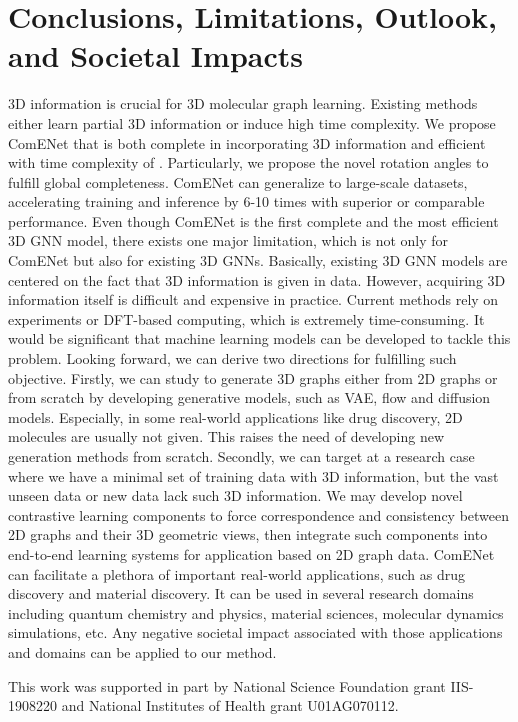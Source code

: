 \documentclass{article}
\begin{document}
\section{Conclusions, Limitations, Outlook, and Societal Impacts}
3D information is crucial for 3D molecular graph learning.
Existing methods either learn partial 3D information or induce high time complexity.
We propose ComENet that is both complete in incorporating 3D information and efficient 
with time complexity of .
Particularly, we propose the novel rotation angles to fulfill global completeness.
ComENet can generalize to large-scale datasets,
accelerating training and inference by 6-10 times with superior or comparable performance.
\textcolor{COLOR}{Even though ComENet is the first complete and the most efficient 3D GNN model, there exists one major limitation, which is not only for
ComENet but also for existing 3D GNNs. Basically, existing 3D GNN models
are centered on the fact that 3D information is given in data.
However, acquiring 3D information itself is difficult and expensive in practice.
Current methods rely on experiments or
DFT-based computing, which is extremely time-consuming. 
It would be significant that machine
learning models can be developed to tackle this problem.
Looking forward, we can derive two directions for fulfilling such objective.
Firstly, we can study to generate 3D graphs either from 2D graphs or from scratch by developing generative models,
such as VAE, flow and diffusion models.
Especially, in some real-world applications like drug discovery, 2D molecules are usually not given.
This raises the need of developing new generation methods from scratch.
Secondly, we can target at a research case where we have a minimal set of training data with
3D information, but the vast unseen data or new data lack such 3D information.
We may develop novel contrastive learning components to force correspondence and consistency 
between 2D graphs and their 3D geometric views,
then integrate such components into end-to-end learning systems for
application based on 2D graph data.
ComENet can facilitate a plethora of important real-world applications, such as drug discovery and material discovery.
It can be used in several research domains including quantum chemistry and physics, material sciences, molecular dynamics simulations, etc.
Any negative societal impact associated with those applications and domains can be applied to our method.}

\begin{ack}
This work was supported in part by National Science Foundation grant IIS-1908220 and National Institutes of Health grant U01AG070112.
\end{ack}
\end{document}
